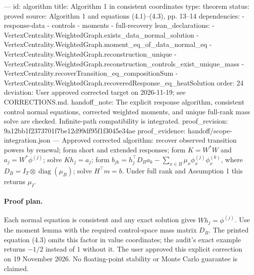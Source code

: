---
id: algorithm
title: Algorithm 1 in consistent coordinates
type: theorem
status: proved
source: Algorithm 1 and equations (4.1)–(4.3), pp. 13–14
dependencies:
- response-data
- controls
- moments
- full-recovery
lean_declarations:
- VertexCentrality.WeightedGraph.exists_data_normal_solution
- VertexCentrality.WeightedGraph.moment_eq_of_data_normal_eq
- VertexCentrality.WeightedGraph.reconstruction_unique
- VertexCentrality.WeightedGraph.reconstruction_controls_exist_unique_mass
- VertexCentrality.recoverTransition_eq_compositionSum
- VertexCentrality.WeightedGraph.recoveredResponse_eq_heatSolution
order: 24
deviation: User approved corrected target on 2026-11-19; see CORRECTIONS.md.
handoff_note: The explicit response algorithm, consistent control normal equations, corrected weighted moments, and unique full-rank mass solve are checked. Infinite-path compatibility is integrated.
proof_revision: 9a12bb1f2373701f7be12d99df95f1f3045e34ae
proof_evidence: handoff/scope-integration.json
---
Approved corrected algorithm: recover observed transition powers by renewal; form short and extended responses; form $K=W^*W$ and $a_j=W^*\phi^{(j)}$; solve $Kh_j=a_j$; form $b_{jk}=h_j^\top D_Ba_k-\sum_{x\in B}\mu_x\phi_x^{(j)}\phi_x^{(k)}$, where $D_B=I_T\otimes\operatorname{diag}(\mu_B)$; solve $H^\top m=b$. Under full rank and Assumption 1 this returns $\mu_I$.

\paragraph{Proof plan.}
Each normal equation is consistent and any exact solution gives $Wh_j=\phi^{(j)}$. Use the moment lemma with the required control-space mass matrix $D_B$. The printed equation (4.3) omits this factor in value coordinates; the audit's exact example returns $-1/2$ instead of $1$ without it. The user approved this explicit correction on 19 November 2026. No floating-point stability or Monte Carlo guarantee is claimed.
